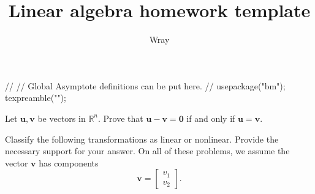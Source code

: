 \documentclass[addpoints, 12pt]{exam}
\title{Linear algebra homework template}
\author{Wray}
\begin{document}
\begin{asydef}
//
// Global Asymptote definitions can be put here.
//
usepackage("bm");
texpreamble("\def\V#1{\bm{#1}}");
\end{asydef}



\bigskip
\bigskip
\smallskip

\begin{questions}

\question
Let $\mathbf{u}, \mathbf{v}$ be vectors in $\mathbb{R}^n$.  
Prove that $\mathbf{u} - \mathbf{v} = \mathbf{0}$ if and only if $\mathbf{u} = \mathbf{v}$.

\question
Classify the following transformations as linear or nonlinear.  Provide the necessary support for your answer.  On all of these problems, we assume the vector $\mathbf{v}$ has components
\begin{equation*}
	\mathbf{v} = \left[ 
    \begin{array}{c}
		v_1 \\ v_2
	\end{array}
    \right] .
\end{equation*}

\bigskip
\bigskip
\begin{parts}
\end{parts}
\end{questions}
\end{document}
